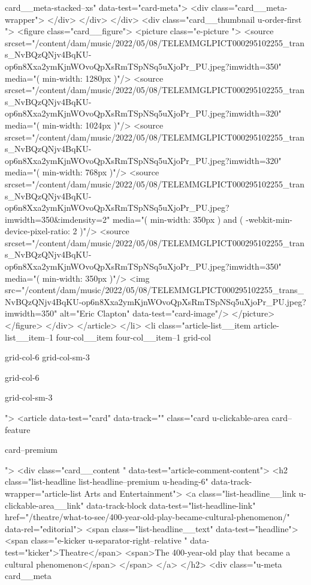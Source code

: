 {{{						
						card__meta-stacked--xs" data-test="card-meta">
<div class="card__meta-wrapper">
</div>
</div>
</div>
<div class="card__thumbnail u-order-first ">
<figure class="card__figure">
<picture class="e-picture   ">
<source srcset="/content/dam/music/2022/05/08/TELEMMGLPICT000295102255_trans_NvBQzQNjv4BqKU-op6n8Xxa2ymKjnWOvoQpXsRmTSpNSq5uXjoPr_PU.jpeg?imwidth=350" media="( min-width: 1280px )"/>
<source srcset="/content/dam/music/2022/05/08/TELEMMGLPICT000295102255_trans_NvBQzQNjv4BqKU-op6n8Xxa2ymKjnWOvoQpXsRmTSpNSq5uXjoPr_PU.jpeg?imwidth=320" media="( min-width: 1024px )"/>
<source srcset="/content/dam/music/2022/05/08/TELEMMGLPICT000295102255_trans_NvBQzQNjv4BqKU-op6n8Xxa2ymKjnWOvoQpXsRmTSpNSq5uXjoPr_PU.jpeg?imwidth=320" media="( min-width: 768px )"/>
<source srcset="/content/dam/music/2022/05/08/TELEMMGLPICT000295102255_trans_NvBQzQNjv4BqKU-op6n8Xxa2ymKjnWOvoQpXsRmTSpNSq5uXjoPr_PU.jpeg?imwidth=350&imdensity=2" media="( min-width: 350px ) and ( -webkit-min-device-pixel-ratio: 2 )"/>
<source srcset="/content/dam/music/2022/05/08/TELEMMGLPICT000295102255_trans_NvBQzQNjv4BqKU-op6n8Xxa2ymKjnWOvoQpXsRmTSpNSq5uXjoPr_PU.jpeg?imwidth=350" media="( min-width: 350px )"/>
<img src="/content/dam/music/2022/05/08/TELEMMGLPICT000295102255_trans_NvBQzQNjv4BqKU-op6n8Xxa2ymKjnWOvoQpXsRmTSpNSq5uXjoPr_PU.jpeg?imwidth=350" alt="Eric Clapton" data-test="card-image"/>
</picture>
</figure>
</div>
</article>
</li>
<li class="article-list__item article-list__item--1 four-col__item four-col__item--1
			grid-col
			
			
			grid-col-6 grid-col-sm-3
			
			grid-col-6
			
			
			
			
			
			grid-col-sm-3
			
			
			
			
			
			
			
			
			">
<article data-test="card" data-track="" class="card
			u-clickable-area
			card--feature
			
			card--premium
			
			
			
			
			
			 ">
<div class="card__content " data-test="article-comment-content">
<h2 class="list-headline list-headline--premium u-heading-6" data-track-wrapper="article-list Arts and Entertainment">
<a class="list-headline__link u-clickable-area__link" data-track-block data-test="list-headline-link" href="/theatre/what-to-see/400-year-old-play-became-cultural-phenomenon/" data-rel="editorial">
<span class="list-headline__text" data-test="headline">
<span class="e-kicker u-separator-right--relative " data-test="kicker">Theatre</span>
<span>The 400-year-old play that became a cultural phenomenon</span>
</span>
</a>
</h2>
<div class="u-meta card__meta
						
}}}
